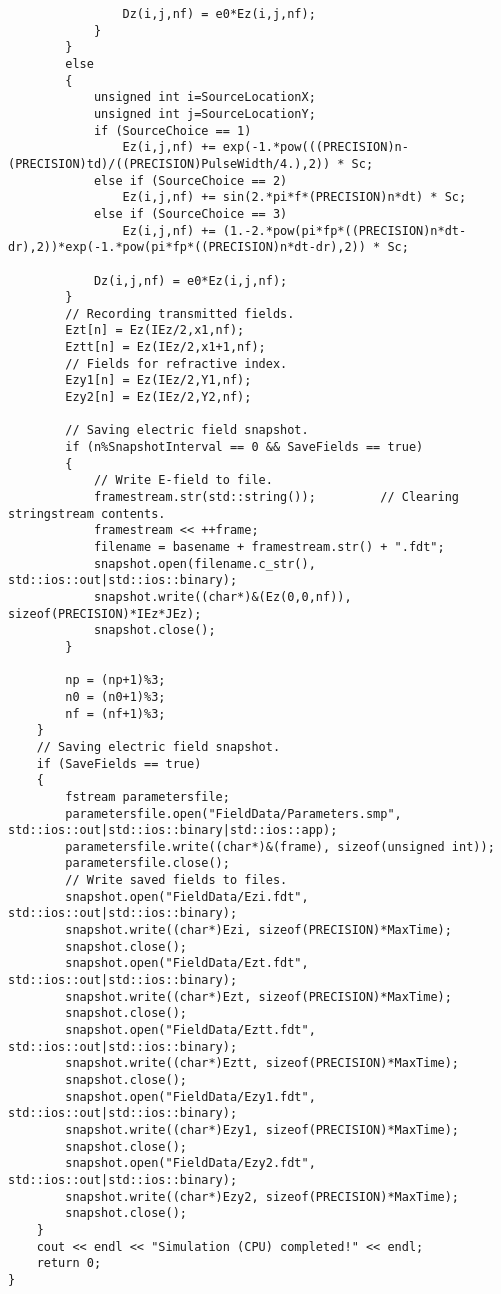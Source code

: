\begin{lstlisting}
				Dz(i,j,nf) = e0*Ez(i,j,nf);
			}
		}
		else
		{
			unsigned int i=SourceLocationX;
			unsigned int j=SourceLocationY;
			if (SourceChoice == 1)
				Ez(i,j,nf) += exp(-1.*pow(((PRECISION)n-(PRECISION)td)/((PRECISION)PulseWidth/4.),2)) * Sc;
			else if (SourceChoice == 2)
				Ez(i,j,nf) += sin(2.*pi*f*(PRECISION)n*dt) * Sc;
			else if (SourceChoice == 3)
				Ez(i,j,nf) += (1.-2.*pow(pi*fp*((PRECISION)n*dt-dr),2))*exp(-1.*pow(pi*fp*((PRECISION)n*dt-dr),2)) * Sc;

			Dz(i,j,nf) = e0*Ez(i,j,nf);
		}
		// Recording transmitted fields.
		Ezt[n] = Ez(IEz/2,x1,nf);
		Eztt[n] = Ez(IEz/2,x1+1,nf);
		// Fields for refractive index.
		Ezy1[n] = Ez(IEz/2,Y1,nf);
		Ezy2[n] = Ez(IEz/2,Y2,nf);

		// Saving electric field snapshot.
		if (n%SnapshotInterval == 0 && SaveFields == true)
		{
			// Write E-field to file.
			framestream.str(std::string());			// Clearing stringstream contents.
			framestream << ++frame;
			filename = basename + framestream.str() + ".fdt";
			snapshot.open(filename.c_str(), std::ios::out|std::ios::binary);
			snapshot.write((char*)&(Ez(0,0,nf)), sizeof(PRECISION)*IEz*JEz);
			snapshot.close();
		}

		np = (np+1)%3;
		n0 = (n0+1)%3;
		nf = (nf+1)%3;
	}
	// Saving electric field snapshot.
	if (SaveFields == true)
	{
		fstream parametersfile;
		parametersfile.open("FieldData/Parameters.smp", std::ios::out|std::ios::binary|std::ios::app);
		parametersfile.write((char*)&(frame), sizeof(unsigned int));
		parametersfile.close();
		// Write saved fields to files.
		snapshot.open("FieldData/Ezi.fdt", std::ios::out|std::ios::binary);
		snapshot.write((char*)Ezi, sizeof(PRECISION)*MaxTime);
		snapshot.close();
		snapshot.open("FieldData/Ezt.fdt", std::ios::out|std::ios::binary);
		snapshot.write((char*)Ezt, sizeof(PRECISION)*MaxTime);
		snapshot.close();
		snapshot.open("FieldData/Eztt.fdt", std::ios::out|std::ios::binary);
		snapshot.write((char*)Eztt, sizeof(PRECISION)*MaxTime);
		snapshot.close();
		snapshot.open("FieldData/Ezy1.fdt", std::ios::out|std::ios::binary);
		snapshot.write((char*)Ezy1, sizeof(PRECISION)*MaxTime);
		snapshot.close();
		snapshot.open("FieldData/Ezy2.fdt", std::ios::out|std::ios::binary);
		snapshot.write((char*)Ezy2, sizeof(PRECISION)*MaxTime);
		snapshot.close();
	}
	cout << endl << "Simulation (CPU) completed!" << endl;
	return 0;
}
\end{lstlisting}
